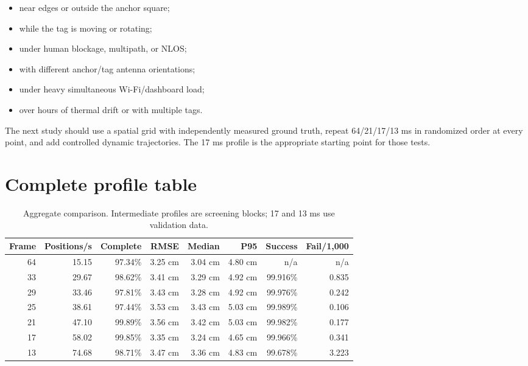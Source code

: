 \documentclass[11pt,a4paper]{article}
\begin{document}
\begin{itemize}[leftmargin=7mm]
  \item near edges or outside the anchor square;
  \item while the tag is moving or rotating;
  \item under human blockage, multipath, or NLOS;
  \item with different anchor/tag antenna orientations;
  \item under heavy simultaneous Wi-Fi/dashboard load;
  \item over hours of thermal drift or with multiple tags.
\end{itemize}

The next study should use a spatial grid with independently measured ground
truth, repeat 64/21/17/13 ms in randomized order at every point, and add
controlled dynamic trajectories. The 17 ms profile is the appropriate
starting point for those tests.

\clearpage
\appendix

\section{Complete profile table}

\begin{table}[H]
  \centering
  \caption{Aggregate comparison. Intermediate profiles are screening blocks;
  17 and 13 ms use validation data.}
  \scriptsize
  \begin{tabular}{rrrrrrrr}
    \toprule
    Frame & Positions/s & Complete & RMSE & Median & P95 & Success & Fail/1,000\\
    \midrule
    64 & 15.15 & 97.34\% & 3.25 cm & 3.04 cm & 4.80 cm & n/a & n/a\\
    33 & 29.67 & 98.62\% & 3.41 cm & 3.29 cm & 4.92 cm & 99.916\% & 0.835\\
    29 & 33.46 & 97.81\% & 3.43 cm & 3.28 cm & 4.92 cm & 99.976\% & 0.242\\
    25 & 38.61 & 97.44\% & 3.53 cm & 3.43 cm & 5.03 cm & 99.989\% & 0.106\\
    21 & 47.10 & 99.89\% & 3.56 cm & 3.42 cm & 5.03 cm & 99.982\% & 0.177\\
    17 & 58.02 & 99.85\% & 3.35 cm & 3.24 cm & 4.65 cm & 99.966\% & 0.341\\
    13 & 74.68 & 98.71\% & 3.47 cm & 3.36 cm & 4.83 cm & 99.678\% & 3.223\\
    \bottomrule
  \end{tabular}
\end{table}
\end{document}
